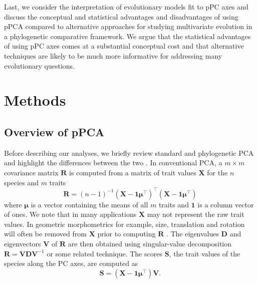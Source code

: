 \documentclass[a4paper,11pt]{article}
\begin{document}
Last, we consider the interpretation of evolutionary models fit to pPC axes and discuss the conceptual and statistical advantages and disadvantages of using pPCA compared to alternative approaches for studying multivariate evolution in a phylogenetic comparative framework. We argue that the statistical advantages of using pPC axes comes at a substantial conceptual cost and that alternative techniques are likely to be much more informative for addressing many evolutionary questions.

\section{Methods}
\subsection{Overview of pPCA}
Before describing our analyses, we briefly review standard and phylogenetic PCA and highlight the differences between the two \citep[see][for a more detailed treatment]{Polly2013}. In conventional PCA, a $m \times m$ covariance matrix $\mathbf{R}$ is computed from a matrix of trait values $\mathbf{X}$ for the $n$ species and $m$ traits
\begin{equation}\label{eq:rpca}
\mathbf{R} = (n-1)^{-1}(\mathbf{X} - \mathbf{1}\boldsymbol{\mu}^\intercal)^\intercal (\mathbf{X} - \mathbf{1}\boldsymbol{\mu}^\intercal)
\end{equation}
where $\boldsymbol{\mu}$ is a vector containing the means of all $m$ traits and $\mathbf{1}$ is a column vector of ones. We note that in many applications $\mathbf{X}$ may not represent the raw trait values. In geometric morphometrics for example, size, translation and rotation will often be removed from $\mathbf{X}$ prior to computing $\mathbf{R}$ \citep{RohlfSlice, Bookstein1997}. The eigenvalues $\mathbf{D}$ and eigenvectors $\mathbf{V}$ of $\mathbf{R}$ are then obtained using singular-value decomposition $\mathbf{R}=\mathbf{V}\mathbf{D}\mathbf{V}^{-1}$ or some related technique. The scores $\mathbf{S}$, the trait values of the species along the PC axes, are computed as
\begin{equation}\label{eq:Spca}
\mathbf{S}=(\mathbf{X} - \mathbf{1}\boldsymbol{\mu}^\intercal)\mathbf{V}.
\end{equation}
\end{document}
